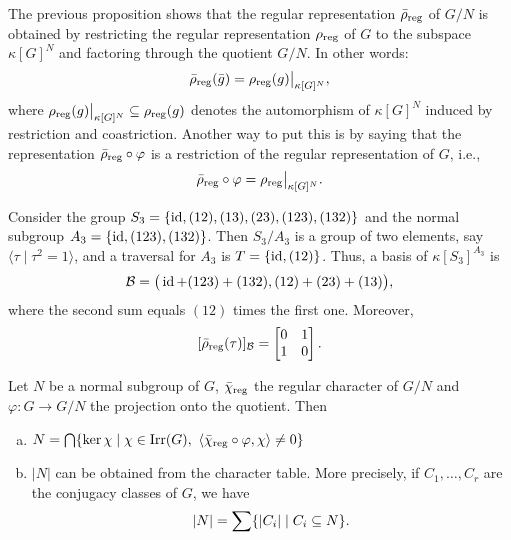 \begin{rem}\label{rem:quotient-representation-as-restriction}
    The previous proposition shows that the regular representation $\rrho[\bar\rho]$ of $G/N$ is obtained by restricting the regular representation $\rrho$ of $G$ to the subspace $\kappa[G]^N$ and factoring through the quotient $G/N$. In other words:
    $$
        \rrho[\bar\rho](\bar g) = \rrho(g)\big|_{\kappa[G]^N},
    $$
    where $\rrho(g)\big|_{\kappa[G]^N}\subseteq\rrho(g)$ denotes the automorphism of $\kappa[G]^N$ induced by restriction and coastriction. Another way to put this is by saying that the representation $\rrho[\bar\rho]\circ\varphi$ is a restriction of the regular representation of $G$, i.e.,
    $$
        \rrho[\bar\rho]\circ\varphi = \rrho\big|_{\kappa[G]^N}.
    $$
\end{rem}

\begin{xmpl}
    Consider the group $S_3=\set{\id,(12),(13),(23),(123),(132)}$ and the normal subgroup $A_3=\set{\id,(123),(132)}$. Then $S_3/A_3$ is a group of two elements, say $\langle\tau\mid\tau^2=1\rangle$, and a traversal for $A_3$ is $T=\set{\id,(12)}$. Thus, a basis of $\kappa[S_3]^{A_3}$ is
    $$
        \basis B=\big(\id+(123)+(132),(12)+(23)+(13)\big),
    $$
    where the second sum equals $(12)$ times the first one. Moreover,
    $$
        [\rrho[\bar\rho](\tau)]_{\basis B}=
            \begin{bmatrix}
                0   &1\\
                1   &0
            \end{bmatrix}.
    $$
\end{xmpl}

\begin{prop}
    Let\/ $N$ be a normal subgroup of\/ $G$, $\rchi[\bar\chi]$ the regular character of\/ $G/N$ and\/ $\varphi\colon G\to G/N$ the projection onto the quotient. Then
    \begin{enumerate}[a),font=\upshape]
        \item $N = \bigcap\set{\ker\chi\mid
                \chi\in\op{Irr}(G),\ \inner{\rchi[\bar\chi]\circ\varphi}{\chi}\ne0}$

        \item $|N|$ can be obtained from the character table. More precisely, if\/ $C_1,\dots,C_r$ are the conjugacy classes of\/ $G$, we have
        $$
            |N|=\sum\set{|C_i|\mid C_i\subseteq N}.
        $$
    \end{enumerate}
\end{prop}

